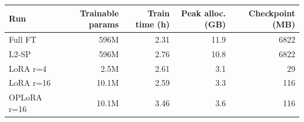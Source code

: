 \begin{tabular}{lrrrr}
\toprule
Run & Trainable params & Train time (h) & Peak alloc. (GB) & Checkpoint (MB) \\
\midrule
Full FT & 596M & 2.31 & 11.9 & 6822 \\
L2-SP & 596M & 2.76 & 10.8 & 6822 \\
LoRA r=4 & 2.5M & 2.61 & 3.1 & 29 \\
LoRA r=16 & 10.1M & 2.59 & 3.3 & 116 \\
OPLoRA r=16 & 10.1M & 3.46 & 3.6 & 116 \\
\bottomrule
\end{tabular}
